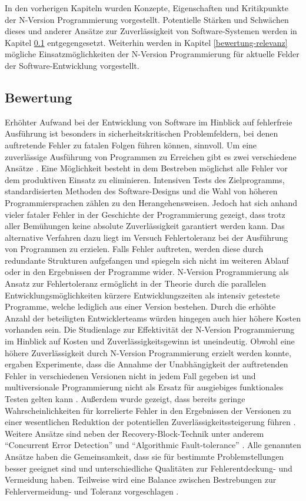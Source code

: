 %
In den vorherigen Kapiteln wurden Konzepte, Eigenschaften und Kritikpunkte der N-Version Programmierung vorgestellt.
Potentielle Stärken und Schwächen dieses und anderer Ansätze zur Zuverlässigkeit von Software-Systemen werden in Kapitel \ref{vergleich} entgegengesetzt. 
Weiterhin werden in Kapitel \ref{bewertung-relevanz} mögliche Einsatzmöglichkeiten der N-Version Programmierung für aktuelle Felder der Software-Entwicklung vorgestellt.
%
\subsection{Bewertung}\label{vergleich}
Erhöhter Aufwand bei der Entwicklung von Software im Hinblick auf fehlerfreie Ausführung ist besonders in sicherheitskritischen Problemfeldern, bei denen auftretende Fehler zu fatalen Folgen führen können, sinnvoll.
Um eine zuverlässige Ausführung von Programmen zu Erreichen gibt es zwei verschiedene Ansätze \cite{Avizienis:1975:FFC:800027.808469}. Eine Möglichkeit besteht in dem Bestreben möglichst alle Fehler vor dem produktiven Einsatz zu eliminieren. Intensiven Tests des Zielprogramms, standardisierten Methoden des Software-Designs und die Wahl von höheren Programmiersprachen zählen zu den Herangehensweisen. Jedoch hat sich anhand vieler fataler Fehler in der Geschichte der Programmierung gezeigt, dass trotz aller Bemühungen keine absolute Zuverlässigkeit garantiert werden kann. Das alternative Verfahren dazu liegt im Versuch Fehlertoleranz bei der Ausführung von Programmen zu erzielen. Falls Fehler auftreten, werden diese durch redundante Strukturen aufgefangen und spiegeln sich nicht im weiteren Ablauf oder in den Ergebnissen der Programme wider. N-Version Programmierung als Ansatz zur Fehlertoleranz ermöglicht in der Theorie durch die parallelen Entwicklungsmöglichkeiten kürzere Entwicklungszeiten als intensiv getestete Programme, welche lediglich aus einer Version bestehen. Durch die erhöhte Anzahl der beteiligten Entwicklerteams würden hingegen auch hier höhere Kosten vorhanden sein. Die Studienlage zur Effektivität der N-Version Programmierung im Hinblick auf Kosten und Zuverlässigkeitsgewinn ist uneindeutig. Obwohl eine höhere Zuverlässigkeit durch N-Version Programmierung erzielt werden konnte, ergaben Experimente, dass die Annahme der Unabhängigkeit der auftretenden Fehler in verschiedenen Versionen nicht in jedem Fall gegeben ist \cite{Knight:1986:EEA:10677.10688} und multiversionale Programmierung nicht als Ersatz für ausgiebiges funktionales Testen gelten kann \cite{Shimeall:1991:ECS:104878.104899}. Außerdem wurde gezeigt, dass bereits geringe Wahrscheinlichkeiten für korrelierte Fehler in den Ergebnissen der Versionen zu einer wesentlichen Reduktion der potentiellen Zuverlässigkeitssteigerung führen \cite{Eckhardt:1985:TBA:1314034.1314066}.
Weitere Ansätze sind neben der Recovery-Block-Technik unter anderem \enquote{Concurrent Error Detection} und \enquote{Algorithmic Fault-tolerance} \cite{229487}. Alle genannten Ansätze haben die Gemeinsamkeit, dass sie für bestimmte Problemstellungen besser geeignet sind und unterschiedliche Qualitäten zur Fehlerentdeckung- und Vermeidung haben. Teilweise wird eine Balance zwischen Bestrebungen zur Fehlervermeidung- und Toleranz vorgeschlagen \cite{Avizienis:1975:FFC:800027.808469}.
%
